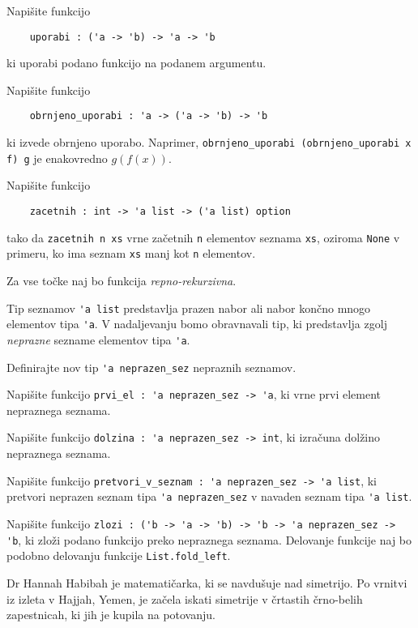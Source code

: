 \documentclass[arhiv]{../izpit}
\begin{document}

\naloga[]

\podnaloga
Napišite funkcijo
\begin{verbatim}
    uporabi : ('a -> 'b) -> 'a -> 'b
\end{verbatim}
ki uporabi podano funkcijo na podanem argumentu.

\podnaloga
Napišite funkcijo
\begin{verbatim}
    obrnjeno_uporabi : 'a -> ('a -> 'b) -> 'b
\end{verbatim}
ki izvede obrnjeno uporabo. Naprimer, \verb|obrnjeno_uporabi (obrnjeno_uporabi x f) g| je enakovredno $g (f (x))$.

\podnaloga
Napišite funkcijo
\begin{verbatim}
    zacetnih : int -> 'a list -> ('a list) option
\end{verbatim}
tako da \verb|zacetnih n xs| vrne začetnih \verb|n| elementov seznama \verb|xs|, oziroma \verb|None| v primeru, ko ima seznam \verb|xs| manj kot \verb|n| elementov.

Za vse točke naj bo funkcija \emph{repno-rekurzivna}.

\naloga[]
Tip seznamov \verb|'a list| predstavlja prazen nabor ali nabor končno mnogo elementov tipa \verb|'a|. V nadaljevanju bomo obravnavali tip, ki predstavlja zgolj \emph{neprazne} sezname elementov tipa \verb|'a|.

\podnaloga
Definirajte nov tip \verb|'a neprazen_sez| nepraznih seznamov.

\podnaloga
Napišite funkcijo \verb|prvi_el : 'a neprazen_sez -> 'a|, ki vrne prvi element nepraznega seznama.

\podnaloga
Napišite funkcijo \verb|dolzina : 'a neprazen_sez -> int|, ki izračuna dolžino nepraznega seznama.

\podnaloga
Napišite funkcijo \verb|pretvori_v_seznam : 'a neprazen_sez -> 'a list|, ki pretvori neprazen seznam tipa \verb|'a neprazen_sez| v navaden seznam tipa \verb|'a list|.

\podnaloga
Napišite funkcijo \verb|zlozi : ('b -> 'a -> 'b) -> 'b -> 'a neprazen_sez -> 'b|, ki zloži podano funkcijo preko nepraznega seznama. Delovanje funkcije naj bo
podobno delovanju funkcije \verb|List.fold_left|.

\naloga[]
Dr Hannah Habibah je matematičarka, ki se navdušuje nad simetrijo. Po vrnitvi iz izleta v Hajjah, Yemen, je začela iskati simetrije v črtastih črno-belih zapestnicah, ki jih je kupila na potovanju.
\end{document}
